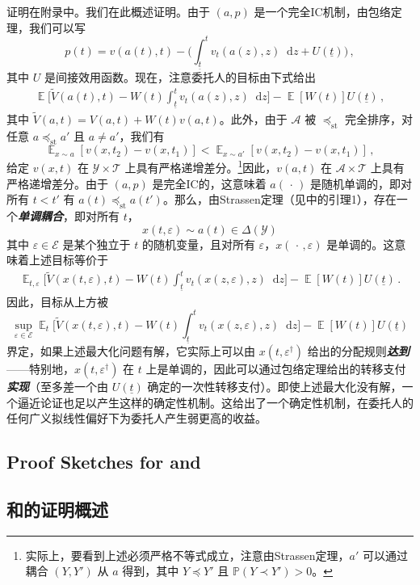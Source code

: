 \documentclass[12pt,letterpaper]{article}
\newenvironment{original}{\color{black}\noindent}{}
\newenvironment{translation}{\color{blue}\noindent}{}
\theoremstyle{plain}
\theoremstyle{definition}
\theoremstyle{remark}
\DeclareMathOperator{\E}{\mathds{E}}
\renewcommand{\P}{\mathds{P}}
\newcommand{\Y}{\mathcal{Y}}
\renewcommand{\1}{\mathds{1}}
\renewcommand{\epsilon}{\varepsilon}
\renewcommand*\d{\mathop{}\!\mathrm{d}}
\theoremstyle{definition}
\begin{document}
\begin{translation}
证明在附录中。我们在此概述证明。由于 $(a, p)$ 是一个完全IC机制，由包络定理，我们可以写
\[p(t) = v(a(t), t) - \Big(\int_{\underline{t}}^t v_t(a(z), z) \d z + U(\underline{t})\Big)\,,\]
其中 $U$ 是间接效用函数。现在，注意委托人的目标由下式给出
\begin{align*}
\E\Bigg[\widetilde{V}(a(t), t) - W(t) \int_{\underline{t}}^t v_t(a(z), z) \d z \Bigg] - \E[W(t)] U(\underline{t})\,,
\end{align*}
其中 $\widetilde{V}(a, t) = V(a, t) + W(t)v(a, t)$。此外，由于 $\mathcal{A}$ 被 $\preceq_{\text{st}}$ 完全排序，对任意 $a \preceq_{\text{st}} a'$ 且 $a \neq a'$，我们有
\[ \E_{x \sim a}[v(x, t_2) - v(x, t_1)] < \E_{x \sim a'}[v(x, t_2) - v(x, t_1)]\,,\]
给定 $v(x, t)$ 在 $\mathcal{Y} \times \mathcal{T}$ 上具有严格递增差分。\footnote{实际上，要看到上述必须严格不等式成立，注意由Strassen定理，$a'$ 可以通过耦合 $(Y, Y')$ 从 $a$ 得到，其中 $Y \preceq Y'$ 且 $\P(Y \prec Y') > 0$。}因此，$v(a, t)$ 在 $\mathcal{A} \times \mathcal{T}$ 上具有严格递增差分。由于 $(a, p)$ 是完全IC的，这意味着 $a(\,\cdot\,)$ 是随机单调的，即对所有 $t < t'$ 有 $a(t) \preceq_{\text{st}} a(t')$。那么，由Strassen定理（见\citealt{yang2022costly}中的引理1），存在一个\textit{\textbf{单调耦合}}，即对所有 $t$，
\[x(t, \epsilon) \sim a(t) \in \Delta(\Y)\]
其中 $\epsilon \in \mathcal{E}$ 是某个独立于 $t$ 的随机变量，且对所有 $\varepsilon$，$x(\,\cdot\,, \epsilon)$ 是单调的。这意味着上述目标等价于
\begin{align*}
\E_{t, \epsilon}\Bigg[\widetilde{V}(x(t, \varepsilon), t) - W(t) \int_{\underline{t}}^t v_t(x(z, \varepsilon), z) \d z \Bigg] - \E[W(t)] U(\underline{t})\,.
\end{align*}
因此，目标从上方被
\[\sup_{\varepsilon \in \mathcal{E}}\E_{t}\Bigg[\widetilde{V}(x(t, \varepsilon), t) - W(t) \int_{\underline{t}}^t v_t(x(z, \varepsilon), z) \d z \Bigg] - \E[W(t)] U(\underline{t})\]
界定，如果上述最大化问题有解，它实际上可以由 $x(t, \epsilon^\dagger)$ 给出的分配规则\textit{\textbf{达到}}——特别地，$x(t, \epsilon^\dagger)$ 在 $t$ 上是单调的，因此可以通过包络定理给出的转移支付\textit{\textbf{实现}}（至多差一个由 $U(\underline{t})$ 确定的一次性转移支付）。即使上述最大化没有解，一个逼近论证也足以产生这样的确定性机制。这给出了一个确定性机制，在委托人的任何广义拟线性偏好下为委托人产生弱更高的收益。
\end{translation}

\begin{original}
\subsection{Proof Sketches for  and }
\end{original}
\begin{translation}
\subsection{和的证明概述}
\end{translation}
\end{document}
